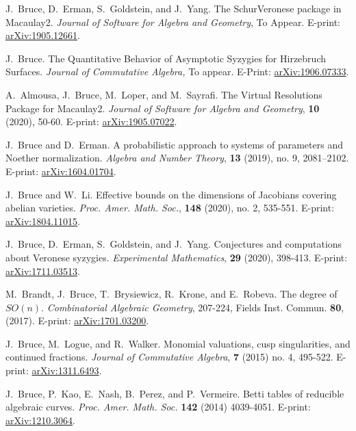 \documentclass[letterpaper,11pt]{article}
\begin{document}
\begin{revnumerate}[12]

\item
	J.~Bruce, D.~Erman, S.~Goldstein, and J.~Yang. The SchurVeronese package in Macaulay2.  {\it Journal of Software for Algebra and Geometry}, To Appear. E-print: \hyperref{https://arxiv.org/abs/1905.12661}{}{}{arXiv:1905.12661}.
	
\item
	J.~Bruce. The Quantitative Behavior of Asymptotic Syzygies for Hirzebruch Surfaces. {\it Journal of Commutative Algebra,} To appear. E-Print:  \hyperref{http://arxiv.org/abs/1906.07333}{}{}{arXiv:1906.07333}.
	
\item
	A.~Almousa, J.~Bruce, M.~Loper, and M.~Sayrafi. The Virtual Resolutions Package for Macaulay2.  {\it Journal of Software for Algebra and Geometry}, \textbf{10} (2020), 50-60. E-print: \hyperref{http://arxiv.org/abs/1905.07022}{}{}{arXiv:1905.07022}.
	
\item
	J.~Bruce and D.~Erman. A probabilistic approach to systems of parameters and Noether normalization. {\it Algebra and Number Theory}, \textbf{13} (2019), no. 9, 2081–2102. E-print: \hyperref{http://arxiv.org/abs/1604.01704}{}{}{arXiv:1604.01704}.
	
\item
	J.~Bruce and W.~Li. Effective bounds on the dimensions of Jacobians covering abelian varieties.  {\it Proc. Amer. Math. Soc.}, \textbf{148} (2020), no. 2, 535-551. E-print: \hyperref{https://arxiv.org/abs/1804.11015}{}{}{arXiv:1804.11015}.
			
\item
	J.~Bruce, D.~Erman, S.~Goldstein, and J.~Yang. Conjectures and computations about Veronese syzygies.  {\it Experimental Mathematics}, \textbf{29} (2020), 398-413. E-print: \hyperref{https://arxiv.org/abs/1711.03513}{}{}{arXiv:1711.03513}.
	
\item
	M.~Brandt, J.~Bruce, T.~Brysiewicz, R.~Krone, and E.~Robeva. The degree of $SO(n)$. {\it Combinatorial Algebraic Geometry}, 207-224, Fields Inst. Commun. \textbf{80}, (2017). E-print: \hyperref{https://arxiv.org/abs/1701.03200}{}{}{arXiv:1701.03200}.
	
\item
	J.~Bruce, M.~Logue, and R.~Walker. Monomial valuations, cusp singularities, and continued fractions. {\it Journal of Commutative Algebra}, \textbf{7} (2015) no. 4, 495-522. E-print: \hyperref{http://arxiv.org/abs/1311.6493}{}{}{arXiv:1311.6493}.

\item
	J.~Bruce, P.~Kao, E.~Nash, B.~Perez, and P.~Vermeire. Betti tables of reducible algebraic curves. {\it Proc. Amer. Math. Soc.} \textbf{142} (2014) 4039-4051. E-print: \hyperref{http://arxiv.org/abs/1210.3064}{}{}{arXiv:1210.3064}.
\end{revnumerate}
\end{document}
